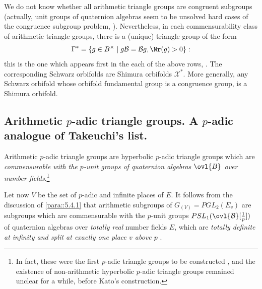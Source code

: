 \begin{para}\label{para::5.4.3} We do not know whether all arithmetic
 triangle groups are 
 congruent subgroups (actually, unit groups of quaternion algebras seem
 to be unsolved hard cases of the congruence subgroup problem, \cf 
 \cite{rapinchuk92:_congr}). Nevertheless, in each commensurability
 class of arithmetic 
 triangle groups, there is a (unique) triangle group of the form
 \begin{equation*} \Gamma^\ast= \{g\in B^\times\mid 
 g\mathcal{B}=\mathcal{B}g, \Nr(g)>0\}: \end{equation*} this is the one
 which appears first in the each of the above rows, \cf
 \cite[Table 3]{ccoatg}. The corresponding Schwarz orbifolds are Shimura
 orbifolds $\mathcal{X}^\ast$. More generally, any Schwarz orbifold whose
 orbifold fundamental group is a congruence group, is a Shimura orbifold.
\end{para}


\subsection{Arithmetic $p$-adic triangle groups. A $p$-adic analogue of
Takeuchi's list.}\label{sub::5.5} 

\begin{para}\label{para::5.5.1} Arithmetic $p$-adic triangle groups are
 hyperbolic $p$-adic triangle groups which are {\it commensurable with
 the $p$-unit groups of quaternion algebras $\ovl{B}$ over number
 fields}.\footnote{In fact, these were the first $p$-adic triangle groups
 to be constructed \cite{poaptg}, and the existence of non-arithmetic
 hyperbolic $p$-adic triangle groups remained unclear for a while, before
 Kato's construction.}
 
 \medskip Let now $V$ be the set of $p$-adic and infinite places of
 $E$. It follows from the discussion of \ref{para::5.4.1} that
 arithmetic subgroups of 
 $G_{(V)}= PGL_2(E_v)$ are subgroups which are commensurable with the
 $p$-unit groups $PSL_1(\ovl{\mathcal{B}}[\frac{1}{p}])$ of quaternion
 algebras over {\it totally real} number fields $E$, which are {\it
 totally definite at infinity and split at exactly one place $v$ above
 $p$ }.
\end{para}

